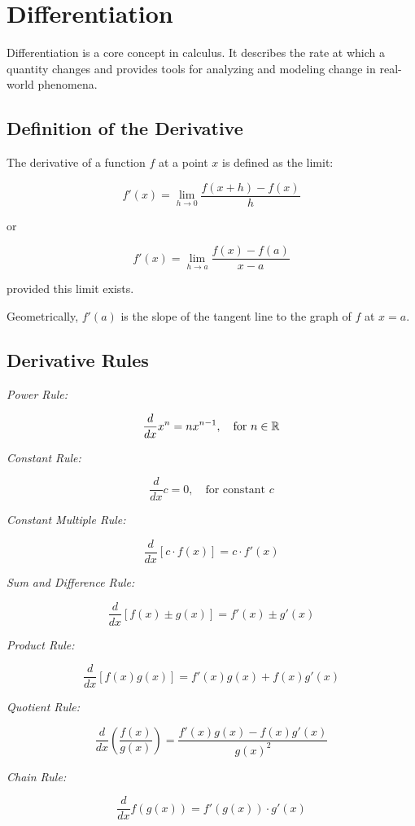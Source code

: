 \newpage
\section{Differentiation}

Differentiation is a core concept in calculus. It describes the rate at which a quantity changes 
and provides tools for analyzing and modeling change in real-world phenomena.

\subsection{Definition of the Derivative}

The derivative of a function \(f\) at a point \(x\) is defined as the limit:

\[
    f'(x) = \lim_{h \to 0} \frac{f(x + h) - f(x)}{h}
\]

or

\[
    f'(x) = \lim_{h \to a}\frac{f(x) - f(a)}{x - a}
\]

provided this limit exists.

Geometrically, \(f'(a)\) is the slope of the tangent line to the graph of \(f\) at \(x = a\).

\subsection{Derivative Rules}

\emph{Power Rule:}

\[
    \frac{d}{dx} x^n = nx^{n - 1}, \quad \text{for } n \in \mathbb{R}
\]

\emph{Constant Rule:}

\[
    \frac{d}{dx} c = 0, \quad \text{for constant } c
\]

\emph{Constant Multiple Rule:}

\[
    \frac{d}{dx} [c \cdot f(x)] = c \cdot f'(x)
\]

\emph{Sum and Difference Rule:}

\[
    \frac{d}{dx} [f(x) \pm g(x)] = f'(x) \pm g'(x)
\]

\emph{Product Rule:}

\[
    \frac{d}{dx} [f(x)g(x)] = f'(x)g(x) + f(x)g'(x)
\]

\emph{Quotient Rule:}

\[
    \frac{d}{dx} \left( \frac{f(x)}{g(x)} \right) = \frac{f'(x)g(x) - f(x)g'(x)}{{g(x)}^2}
\]

\emph{Chain Rule:}

\[
    \frac{d}{dx} f(g(x)) = f'(g(x)) \cdot g'(x)
\]


